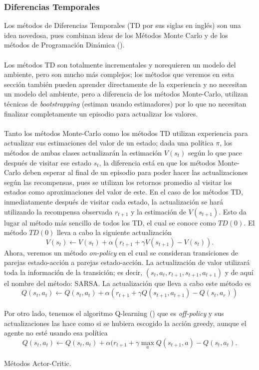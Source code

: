 \documentclass[11pt]{article}
\theoremstyle{plain}
\begin{document}
\subsubsection{Diferencias Temporales}
Los métodos de Diferencias Temporales (TD por sus siglas en inglés)  son una idea novedosa, pues combinan ideas de los Métodos Monte Carlo y de los métodos de Programación Dinámica (\cite{sutton1998reinforcement}).\\
\\
Los métodos TD son totalmente incrementales y  norequieren un modelo del ambiente, pero son mucho más complejos; los métodos que veremos en esta sección también pueden aprender directamente de la experiencia y no necesitan un modelo del ambiente, pero a diferencia de los métodos Monte-Carlo, utilizan técnicas de \textit{bootstrapping} (estiman usando estimadores) por lo que no necesitan finalizar completamente un episodio para actualizar los valores.\\
\\
Tanto los métodos Monte-Carlo como los métodos TD utilizan experiencia para actualizar sus estimaciones del valor de un estado; dada una política $\pi$, los métodos de ambas clases actualizarán la estimación $V(s_t)$ según lo que pace después de visitar ese estado $s_t$, la diferencia está en que los métodos Monte-Carlo deben esperar al final de un episodio para poder hacer las actualizaciones según las recompensas, pues se utilizan los retornos promedio al visitar los estados como aproximaciones del valor de este. En el caso de los métodos TD, inmediatamente después de visitar cada estado, la actualización se hará utilizando la recompensa observada $r_{t+1}$ y la estimación de $V(s_{t+1})$. Esto da lugar al método más sencillo de todos los TD, el cual se conoce como $TD(0)$. El método $TD(0)$  lleva a cabo la siguiente actualización
\[ V(s_t) \leftarrow V(s_t) + \alpha ( r_{t+1} + \gamma V(s_{t+1}) - V(s_t)). \]
Ahora, veremos un método \textit{on-policy} en el cual se consideran transiciones de parejas estado-acción a parejas estado-acción. La actualización de valor utilizará toda la información  de la transición; es decir, $(s_t,a_t,r_{t+1},s_{t+1},a_{t+1})$ y de aquí el nombre del método: SARSA. La actualización que lleva a cabo este método es
\[ Q(s_t,a_t) \leftarrow Q(s_t,a_t) + \alpha (r_{t+1} + \gamma Q(s_{t+1},a_{t+1})-Q(s_t,a_r)) \]
\\
Por otro lado, tenemos el algoritmo Q-learning (\cite{watkins1992q}) que es \textit{off-policy} y sus actualizaciones las hace como si se hubiera escogido la acción greedy, aunque el agente no esté usando esa política
\[ Q(s_t,a_t) \leftarrow Q(s_t,a_t)  + \alpha (r_{t+1} + \gamma \max_a Q(s_{t+1},a) - Q(s_t,a_t).  \]
\\
Métodos Actor-Critic.
\end{document}
